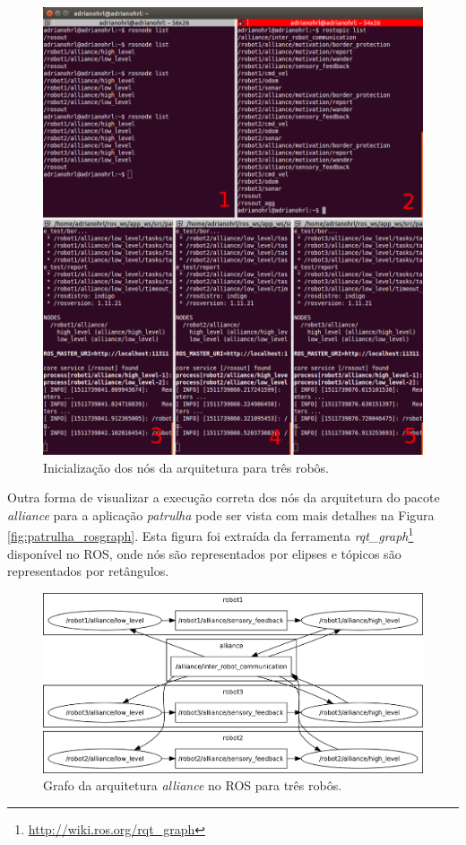             \begin{figure}[htb]
                \centering
                \includegraphics[width=.97\textwidth]{Figuras/4_resultados/patrulha_launches.png}
                \caption{Inicialização dos nós da arquitetura para três robôs.} \label{fig:patrulha_launches}
            \end{figure}
            
            Outra forma de visualizar a execução correta dos nós da arquitetura do pacote \textit{alliance} para a aplicação \textit{patrulha} pode ser vista com mais detalhes na Figura \ref{fig:patrulha_rosgraph}. Esta figura foi extraída da ferramenta \textit{rqt\_graph}\footnote{\url{http://wiki.ros.org/rqt_graph}} disponível no ROS, onde nós são representados por elipses e tópicos são representados por retângulos.
        
            \begin{figure}[p]
                \centering
                \includegraphics[width=.95\textheight,angle=90]{Figuras/4_resultados/alliance_rosgraph.png}
                \caption{Grafo da arquitetura \textit{alliance} no ROS para três robôs.} \label{fig:alliance_rosgraph}
            \end{figure}
        
